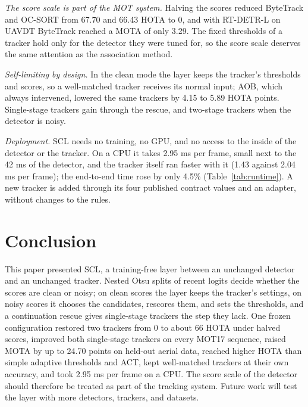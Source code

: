 \documentclass[pdflatex,sn-mathphys-num,iicol]{sn-jnl}
\newcommand{\scl}{SCL}
\newcommand{\aob}{AOB}
\begin{document}
\emph{The score scale is part of the MOT system.} Halving the scores reduced ByteTrack and OC-SORT
from 67.70 and 66.43 HOTA to 0, and with RT-DETR-L on UAVDT ByteTrack reached a MOTA of only 3.29.
The fixed thresholds of a tracker hold only for the detector they were tuned for, so the score
scale deserves the same attention as the association method.

\emph{Self-limiting by design.} In the clean mode the layer keeps the tracker's thresholds and
scores, so a well-matched tracker receives its normal input; \aob{}, which always intervened,
lowered the same trackers by 4.15 to 5.89 HOTA points. Single-stage trackers gain through the
rescue, and two-stage trackers when the detector is noisy.

\emph{Deployment.} \scl{} needs no training, no GPU, and no access to the inside of the detector or
the tracker. On a CPU it takes 2.95 ms per frame, small next to the 42 ms of the detector, and the
tracker itself ran faster with it (1.43 against 2.04 ms per frame); the end-to-end time rose by
only 4.5\% (Table~\ref{tab:runtime}). A new tracker is added through its four published contract
values and an adapter, without changes to the rules.
\section{Conclusion}\label{sec:conclusion}

This paper presented \scl{}, a training-free layer between an unchanged detector and an unchanged
tracker. Nested Otsu splits of recent logits decide whether the scores are clean or noisy; on clean
scores the layer keeps the tracker's settings, on noisy scores it chooses the candidates, rescores
them, and sets the thresholds, and a continuation rescue gives single-stage trackers the step they
lack. One frozen configuration restored two trackers from 0 to about 66 HOTA under halved scores,
improved both single-stage trackers on every MOT17 sequence, raised MOTA by up to 24.70 points on
held-out aerial data, reached higher HOTA than simple adaptive thresholds and ACT, kept well-matched
trackers at their own accuracy, and took 2.95 ms per frame on a CPU. The score scale of the detector should therefore be treated as part of
the tracking system. Future work will test the layer with more detectors, trackers, and datasets.

\backmatter

\end{document}
